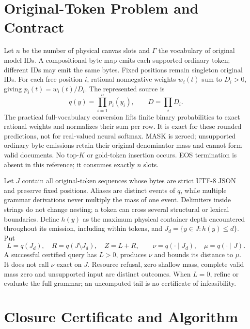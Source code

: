 \documentclass[12pt]{article}
\theoremstyle{readable}
\newcommand{\vocab}{\Gamma}
\begin{document}
\section{Original-Token Problem and Contract}

Let $n$ be the number of physical canvas slots and $\vocab$ the vocabulary of
original model IDs. A compositional byte map emits each supported ordinary
token; different IDs may emit the same bytes. Fixed positions remain singleton
original IDs. For each free position $i$, rational nonnegative weights
$w_i(t)$ sum to $D_i>0$, giving $p_i(t)=w_i(t)/D_i$. The represented source is
\begin{equation}
 q(y)=\prod_{i=1}^n p_i(y_i),\qquad D=\prod_iD_i.
 \label{eq:product}
\end{equation}
The practical full-vocabulary conversion lifts finite binary probabilities
to exact rational weights and normalizes their sum per row. It is exact for
these rounded predictions, not for real-valued neural softmax. MASK is zeroed;
unsupported ordinary byte emissions retain their original denominator mass
and cannot form valid documents. No top-$K$ or gold-token insertion occurs.
EOS termination is absent in this reference; it consumes exactly $n$ slots.

Let $J$ contain all original-token sequences whose bytes are strict UTF-8 JSON
and preserve fixed positions. Aliases are distinct events of $q$, while
multiple grammar derivations never multiply the mass of one event. Delimiters
inside strings do not change nesting; a token can cross several structural
or lexical boundaries. Define $h(y)$ as the maximum physical container depth
encountered throughout its emission, including within tokens, and
$J_d=\{y\in J:h(y)\le d\}$. Put
\begin{equation}
 L=q(J_d),\quad R=q(J\setminus J_d),\quad Z=L+R,
 \qquad \nu=q(\cdot\mid J_d),\quad\mu=q(\cdot\mid J).
\end{equation}
A successful certified query has $L>0$, produces $\nu$ and bounds its distance
to $\mu$. It does not call $\nu$ exact on $J$. Resource refusal, zero shallow
mass, complete valid mass zero and unsupported input are distinct outcomes.
When $L=0$, refine or evaluate the full grammar; an uncomputed tail is no
certificate of infeasibility.

\section{Closure Certificate and Algorithm}
\end{document}
